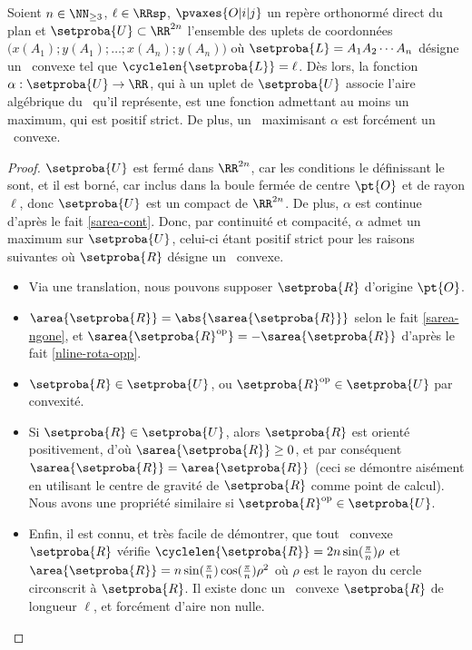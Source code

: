 \begin{fact} \label{at-least-one-ncycle}
    Soient $n \in \NN_{\geq3}$,
    $\ell \in \RRsp$,
    $\pvaxes{O | i | j}$ un repère orthonormé direct du plan
    et
    $\setproba{U} \subset \RR^{2n}$ l'ensemble des uplets de coordonnées $\big( x(A_1) ; y(A_1) ; \dots ; x(A_n) ; y(A_n) \big)$ où $\setproba{L} = A_1 A_2 \cdots A_n$ désigne un \ncycle\ convexe tel que $\cyclelen{\setproba{L}} = \ell$.
    Dès lors, la fonction $\alpha: \setproba{U} \rightarrow \RR$, qui à un uplet de $\setproba{U}$ associe l'aire algébrique du \ncycle\ qu'il représente, est une fonction admettant au moins un maximum, qui est positif strict.
    De plus, un \ncycle\ maximisant $\alpha$ est forcément un \ngone\ convexe.
\end{fact}


\begin{proof}
     $\setproba{U}$ est fermé dans $\RR^{2n}$, car les conditions le définissant le sont, et il est borné, car inclus dans la boule fermée de centre $\pt{O}$ et de rayon $\ell$,
     donc $\setproba{U}$ est un compact de $\RR^{2n}$.
     De plus, $\alpha$ est continue d'après le fait \ref{sarea-cont}.
     Donc, par continuité et compacité, $\alpha$ admet un maximum sur $\setproba{U}$, celui-ci étant positif strict pour les raisons suivantes où $\setproba{R}$ désigne un \nreg\ convexe.
    \begin{itemize}
		\item Via une translation, nous pouvons supposer $\setproba{R}$ d'origine $\pt{O}$.

        \item $\area{\setproba{R}} = \abs{\sarea{\setproba{R}}}$
		selon le fait \ref{sarea-ngone},
		et
		$\sarea{\setproba{R}^{\mathrm{op}}} = - \sarea{\setproba{R}}$ d'après le fait \ref{nline-rota-opp}.
		
		\item $\setproba{R} \in \setproba{U}$, ou $\setproba{R}^{\mathrm{op}} \in \setproba{U}$ par convexité.
		
		\item Si $\setproba{R} \in \setproba{U}$, alors 
		$\setproba{R}$ est orienté positivement, 
		d'où $\sarea{\setproba{R}} \geq 0$, 
		et par conséquent $\sarea{\setproba{R}} = \area{\setproba{R}}$ 
		(ceci se démontre aisément en utilisant le centre de gravité de $\setproba{R}$ comme point de calcul). 
		Nous avons une propriété similaire si $\setproba{R}^{\mathrm{op}} \in \setproba{U}$.

        \item Enfin, il est connu, et très facile de démontrer, que tout \nreg\ convexe $\setproba{R}$ vérifie
        $\cyclelen{\setproba{R}} = 2 n \sin (\frac{\pi}{n}) \rho$
		et
		$\area{\setproba{R}} = n \sin (\frac{\pi}{n})  \cos (\frac{\pi}{n}) \rho^2$
		où $\rho$ est le rayon du cercle circonscrit à $\setproba{R}$.
		Il existe donc un \nreg\ convexe $\setproba{R}$ de longueur $\ell$, et forcément d'aire non nulle.
    \end{itemize}


\end{proof}
